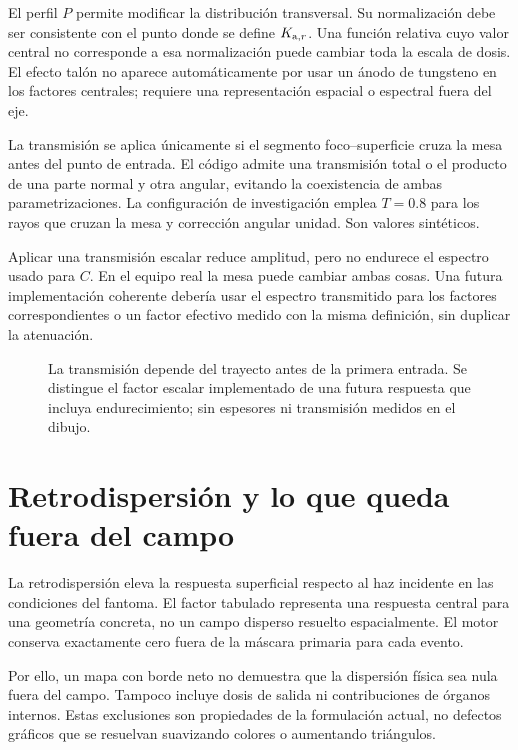 El perfil $P$ permite modificar la distribución transversal. Su normalización debe ser consistente con el punto donde se define $K_{\mathrm{a},r}$. Una función relativa cuyo valor central no corresponde a esa normalización puede cambiar toda la escala de dosis. El efecto talón no aparece automáticamente por usar un ánodo de tungsteno en los factores centrales; requiere una representación espacial o espectral fuera del eje.

La transmisión se aplica únicamente si el segmento foco--superficie cruza la mesa antes del punto de entrada. El código admite una transmisión total o el producto de una parte normal y otra angular, evitando la coexistencia de ambas parametrizaciones. La configuración de investigación emplea $T=\num{0.8}$ para los rayos que cruzan la mesa y corrección angular unidad. Son valores sintéticos.

Aplicar una transmisión escalar reduce amplitud, pero no endurece el espectro usado para $C$. En el equipo real la mesa puede cambiar ambas cosas. Una futura implementación coherente debería usar el espectro transmitido para los factores correspondientes o un factor efectivo medido con la misma definición, sin duplicar la atenuación.



\begin{figure}[htbp]\centering
\caption{La transmisión depende del trayecto antes de la primera entrada. Se distingue el factor escalar implementado de una futura respuesta que incluya endurecimiento; sin espesores ni transmisión medidos en el dibujo.}\label{fig:mesa}\end{figure}

\section{Retrodispersión y lo que queda fuera del campo}
La retrodispersión eleva la respuesta superficial respecto al haz incidente en las condiciones del fantoma. El factor tabulado representa una respuesta central para una geometría concreta, no un campo disperso resuelto espacialmente. El motor conserva exactamente cero fuera de la máscara primaria para cada evento.

Por ello, un mapa con borde neto no demuestra que la dispersión física sea nula fuera del campo. Tampoco incluye dosis de salida ni contribuciones de órganos internos. Estas exclusiones son propiedades de la formulación actual, no defectos gráficos que se resuelvan suavizando colores o aumentando triángulos.

